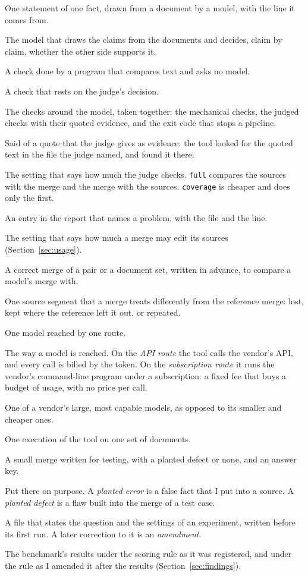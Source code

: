 \begin{wordlist}
\item[claim] One statement of one fact, drawn from a document by a model, with the line it comes from.
\item[judge] The model that draws the claims from the documents and decides, claim by claim, whether the other side supports it.
\item[mechanical check] A check done by a program that compares text and asks no model.
\item[judged check] A check that rests on the judge's decision.
\item[guardrails] The checks around the model, taken together: the mechanical checks, the judged checks with their quoted evidence, and the exit code that stops a pipeline.
\item[grounded] Said of a quote that the judge gives as evidence: the tool looked for the quoted text in the file the judge named, and found it there.
\item[verification depth] The setting that says how much the judge checks. \texttt{full} compares the sources with the merge and the merge with the sources. \texttt{coverage} is cheaper and does only the first.
\item[finding] An entry in the report that names a problem, with the file and the line.
\item[fidelity level] The setting that says how much a merge may edit its sources (Section~\ref{sec:usage}).
\item[reference merge] A correct merge of a pair or a document set, written in advance, to compare a model's merge with.
\item[deviation] One source segment that a merge treats differently from the reference merge: lost, kept where the reference left it out, or repeated.
\item[configuration] One model reached by one route.
\item[route] The way a model is reached. On the \emph{API route} the tool calls the vendor's API, and every call is billed by the token. On the \emph{subscription route} it runs the vendor's command-line program under a subscription: a fixed fee that buys a budget of usage, with no price per call.
\item[frontier model] One of a vendor's large, most capable models, as opposed to its smaller and cheaper ones.
\item[run] One execution of the tool on one set of documents.
\item[test case] A small merge written for testing, with a planted defect or none, and an answer key.
\item[planted] Put there on purpose. A \emph{planted error} is a false fact that I put into a source. A \emph{planted defect} is a flaw built into the merge of a test case.
\item[registration] A file that states the question and the settings of an experiment, written before its first run. A later correction to it is an \emph{amendment}.
\item[registered scoring, amended scoring] The benchmark's results under the scoring rule as it was registered, and under the rule as I amended it after the results (Section~\ref{sec:findings}).
\end{wordlist}
